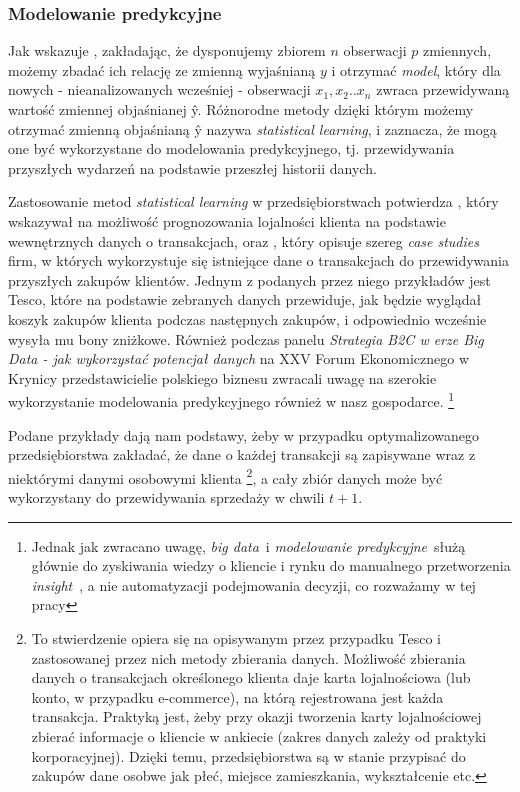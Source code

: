 \documentclass[polish, twoside, 12pt, a4paper]{article}
\theoremstyle{definition}
\theoremstyle{plain}
\theoremstyle{remark}
\begin{document}
\subsubsection{Modelowanie predykcyjne} \label{statistical} 
Jak wskazuje \cite{James2013}, zakładając, że dysponujemy zbiorem $n$ obserwacji $p$ zmiennych, możemy zbadać ich relację ze zmienną wyjaśnianą $y$ i otrzymać \textit{model}, który dla nowych - nieanalizowanych wcześniej - obserwacji $x_1,x_2..x_n$  zwraca przewidywaną wartość zmiennej objaśnianej \^{y}. Różnorodne metody dzięki którym możemy otrzymać zmienną objaśnianą \^{y} \cite{James2013} nazywa \textit{statistical learning}, i zaznacza, że mogą one być wykorzystane do modelowania predykcyjnego, tj. przewidywania przyszłych wydarzeń na podstawie przeszłej historii danych. 

Zastosowanie metod \textit{statistical learning} w przedsiębiorstwach potwierdza \cite{Buckinx2007}, który wskazywał na możliwość prognozowania lojalności klienta na podstawie wewnętrznych danych o transakcjach, oraz \cite{Davenport2011}, który opisuje szereg  \textit{case studies} firm, w których wykorzystuje się istniejące dane o transakcjach do przewidywania przyszłych zakupów klientów. Jednym z podanych przez niego przykładów jest Tesco, które na podstawie zebranych danych przewiduje, jak będzie wyglądał koszyk zakupów klienta podczas następnych zakupów, i odpowiednio wcześnie wysyła mu bony zniżkowe. Również podczas panelu \textit{Strategia B2C w erze Big Data - jak wykorzystać potencjał danych} na XXV Forum Ekonomicznego w Krynicy przedstawicielie polskiego biznesu zwracali uwagę na szerokie wykorzystanie modelowania predykcyjnego również w nasz gospodarce. \footnote{Jednak jak zwracano uwagę, \textit{big data}\ i \textit{modelowanie predykcyjne}\ służą głównie do zyskiwania wiedzy o kliencie i rynku do manualnego przetworzenia \textit{insight}\ , a nie automatyzacji podejmowania decyzji, co rozważamy w tej pracy}

Podane przykłady dają nam podstawy, żeby w przypadku optymalizowanego przedsiębiorstwa zakładać, że dane o każdej transakcji są zapisywane wraz z niektórymi danymi osobowymi klienta \footnote{To stwierdzenie opiera się na opisywanym przez \cite{Davenport2011} przypadku Tesco i zastosowanej przez nich metody zbierania danych. Możliwość zbierania danych o transakcjach określonego klienta daje karta lojalnościowa (lub konto, w przypadku e-commerce), na którą rejestrowana jest każda transakcja. Praktyką jest, żeby przy okazji tworzenia karty lojalnościowej zbierać informacje o kliencie w ankiecie (zakres danych zależy od praktyki korporacyjnej). Dzięki temu, przedsiębiorstwa są w stanie przypisać do zakupów dane osobwe jak płeć, miejsce zamieszkania, wykształcenie etc.}, a cały zbiór danych może być wykorzystany do przewidywania sprzedaży w chwili $t + 1$. 
\end{document}
